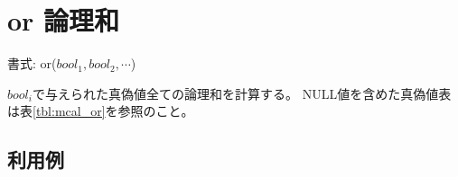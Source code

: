 
%

\section{or 論理和\label{sect:or}}

書式: or($bool_1,bool_2,\cdots$)

$bool_i$で与えられた真偽値全ての論理和を計算する。
NULL値を含めた真偽値表は表\ref{tbl:mcal_or}を参照のこと。

\subsection*{利用例}


%

